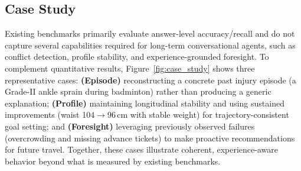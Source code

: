\subsection{Case Study}
Existing benchmarks primarily evaluate answer-level accuracy/recall and do not capture several capabilities required for long-term conversational agents, such as conflict detection, profile stability, and experience-grounded foresight. To complement quantitative results, Figure~\ref{fig:case_study} shows three representative cases: \textbf{(Episode)} reconstructing a concrete past injury episode (a Grade-II ankle sprain during badminton) rather than producing a generic explanation; \textbf{(Profile)} maintaining longitudinal stability and using sustained improvements (waist 104$\rightarrow$96\,cm with stable weight) for trajectory-consistent goal setting; and \textbf{(Foresight)} leveraging previously observed failures (overcrowding and missing advance tickets) to make proactive recommendations for future travel.
Together, these cases illustrate coherent, experience-aware behavior beyond what is measured by existing benchmarks.